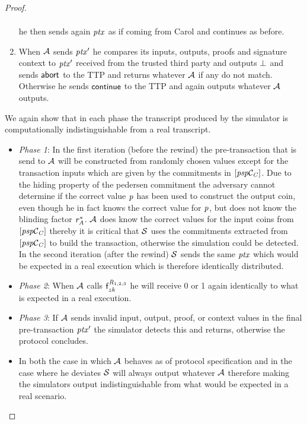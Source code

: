 \begin{proof}
\begin{enumerate}
\begin{gather*}
        \end{gather*}
        he then sends again $\mathit{ptx}$ as if coming from Carol and continues as before.
        \item When $\mathcal{A}$ sends ${\mathit{ptx}}'$ he compares its inputs, outputs, proofs and signature context to ${\mathit{ptx}}'$ received from the trusted third party and outputs $\bot$ and sends $\mathsf{abort}$ to the TTP and returns whatever $\mathcal{A}$ if any do not match.
        Otherwise he sends $\mathsf{continue}$ to the TTP and again outputs whatever $\mathcal{A}$ outputs.
    \end{enumerate}

    We again show that in each phase the transcript produced by the simulator is computationally indistinguishable from a real transcript.

    \begin{itemize}
        \item \textit{Phase 1}: In the first iteration (before the rewind) the pre-transaction that is send to $\mathcal{A}$ will be constructed from randomly chosen values except for the transaction inputs which are given by the commitments in $[\mathit{psp}\mathcal{C}_{\mathit{C}}]$.
        Due to the hiding property of the pedersen commitment the adversary cannot determine if the correct value $\mathit{p}$ has been used to construct the output coin, even though he in fact knows the correct value for $\mathit{p}$, but does not know the blinding factor $\mathit{r}_{\mathit{A}}^*$.
        $\mathcal{A}$ does know the correct values for the input coins from $[\mathit{psp}\mathcal{C}_{\mathit{C}}]$ thereby it is critical that $\mathcal{S}$ uses the commitments extracted from $[\mathit{psp}\mathcal{C}_{\mathit{C}}]$ to build the transaction, otherwise the simulation could be detected.
        In the second iteration (after the rewind) $\mathcal{S}$ sends the same $\mathit{ptx}$ which would be expected in a real execution which is therefore identically distributed.
        \item \textit{Phase 2}: When $\mathcal{A}$ calls $\mathsf{f}^{\mathit{R}_{1,2,3}}_{zk}$ he will receive 0 or 1 again identically to what is expected in a real execution.
        \item \textit{Phase 3}: If $\mathcal{A}$ sends invalid input, output, proof, or context values in the final pre-transaction ${\mathit{ptx}}'$ the simulator detects this and returns, otherwise the protocol concludes.
        \item In both the case in which $\mathcal{A}$ behaves as of protocol specification and in the case where he deviates $\mathcal{S}$ will always output whatever $\mathcal{A}$ therefore making the simulators output indistinguishable from what would be expected in a real scenario.
    \end{itemize}


\end{proof}
